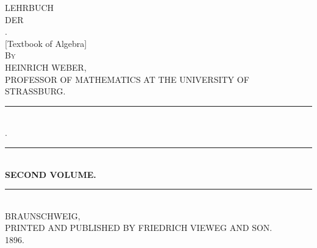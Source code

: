 \begin{center}
\vspace*{2cm}
{\LARGE LEHRBUCH}\\[1.2cm]
{\small DER}\\[1.2cm]
{\Huge {}.}\\[0.5cm]
{\large [Textbook of Algebra]}\\[1.5cm]
{\large \textsc{By}}\\[1.2cm]
{\LARGE HEINRICH WEBER,}\\[0.2cm]
{\footnotesize PROFESSOR OF MATHEMATICS AT THE UNIVERSITY OF STRASSBURG.}\\[1.2cm]
\rule{2.5cm}{0.4pt}\\[1.2cm]
{\large {}.}\\[0.8cm]
\rule{2cm}{0.4pt}\\[0.6cm]
{\large \textbf{SECOND VOLUME.}}\\[3.5cm]
\rule{\textwidth}{1pt}\\[0.8cm]
{\Large BRAUNSCHWEIG,}\\[0.3cm]
{\small PRINTED AND PUBLISHED BY FRIEDRICH VIEWEG AND SON.}\\[0.3cm]
{\Large 1896.}
\end{center}
